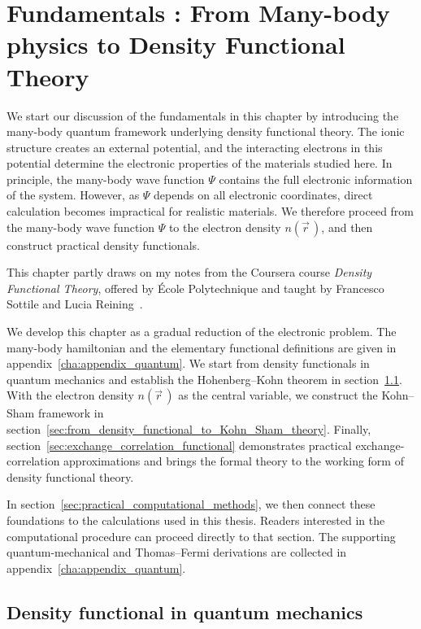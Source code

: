 \chapter[Fundamentals \textRoman{1}: From Many-Body Physics to DFT]{Fundamentals : From Many-body physics to Density Functional Theory}
\label{cha:fundamentals_a}

We start our discussion of the fundamentals in this chapter by introducing the many-body quantum framework underlying density functional theory.
The ionic structure creates an external potential, and the interacting electrons in this potential determine the electronic properties of the materials studied here.
In principle, the many-body wave function $\Psi$ contains the full electronic information of the system.
However, as $\Psi$ depends on all electronic coordinates, direct calculation becomes impractical for realistic materials.
We therefore proceed from the many-body wave function $\Psi$ to the electron density $n(\vec{r}\,)$, and then construct practical density functionals.

This chapter partly draws on my notes from the Coursera course \textit{Density Functional Theory}, offered by École Polytechnique and taught by Francesco Sottile and Lucia Reining~\cite{sottile_reining_dft_coursera}.

We develop this chapter as a gradual reduction of the electronic problem.
The many-body hamiltonian and the elementary functional definitions are given in appendix~\ref{cha:appendix_quantum}.
We start from density functionals in quantum mechanics and establish the Hohenberg--Kohn theorem in section~\ref{sec:introduction_density_functionals}.
With the electron density $n(\vec{r}\,)$ as the central variable, we construct the Kohn--Sham framework in section~\ref{sec:from_density_functional_to_Kohn_Sham_theory}.
Finally, section~\ref{sec:exchange_correlation_functional} demonstrates practical exchange-correlation approximations and brings the formal theory to the working form of density functional theory.

In section~\ref{sec:practical_computational_methods},
we then connect these foundations to the calculations used in this thesis.
Readers interested in the computational procedure can proceed directly to that section.
The supporting quantum-mechanical and Thomas--Fermi derivations are collected in appendix~\ref{cha:appendix_quantum}.

\newpage
\section{Density functional in quantum mechanics}
\label{sec:introduction_density_functionals}

